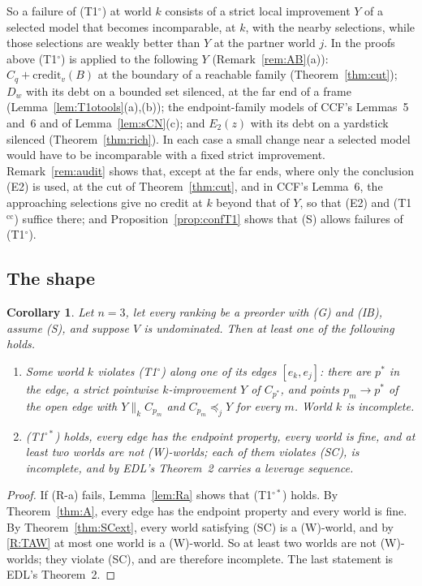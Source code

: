 \documentclass[11pt]{article}
\newtheorem{corollary}[theorem]{Corollary}
\theoremstyle{definition}\newtheorem{definition}[theorem]{Definition}
\theoremstyle{remark}\newtheorem{remark}[theorem]{Remark}
\newcommand{\cred}{\mathrm{credit}}
\newcommand{\To}{\textup{(T1$^\circ$)}}
\newcommand{\Tos}{\textup{(T1$^{\circ*}$)}}
\newcommand{\Tcc}{\textup{(T1$^{\mathrm{cc}}$)}}
\begin{document}
So a failure of \To{} at world $k$ consists of a strict local improvement
$Y$ of a selected model that becomes incomparable, at $k$, with the nearby
selections, while those selections are weakly better than $Y$ at the
partner world $j$. In the proofs above \To{} is applied to the following
$Y$ (Remark~\ref{rem:AB}(a)): $C_q+\cred_v(B)$ at the boundary of a
reachable family (Theorem~\ref{thm:cut}); $D_w$ with its debt on a bounded
set silenced, at the far end of a frame (Lemma~\ref{lem:T1otools}(a),(b));
the endpoint-family models of CCF's Lemmas~5 and~6 and of
Lemma~\ref{lem:sCN}(c); and $E_2(z)$ with its debt on a yardstick silenced
(Theorem~\ref{thm:rich}). In each case a small change near a selected model
would have to be incomparable with a fixed strict improvement.
Remark~\ref{rem:audit} shows that, except at the far ends, where only the
conclusion (E2) is used, at the cut of Theorem~\ref{thm:cut}, and in CCF's
Lemma~6, the approaching selections give no credit at $k$ beyond that of
$Y$, so that (E2) and \Tcc{} suffice there; and
Proposition~\ref{prop:confT1} shows that (S) allows failures of \To.

\subsection{The shape}\label{sec:C}

\begin{corollary}\label{cor:C}
Let $n=3$, let every ranking be a preorder with (G) and (IB), assume (S),
and suppose $V$ is undominated. Then at least one of the following holds.
\begin{enumerate}[label=(R-\alph*),leftmargin=*,itemsep=2pt]
\item Some world $k$ violates \To{} along one of its edges $[e_k,e_j]$:
there are $p^*$ in the edge, a strict pointwise $k$-improvement $Y$ of
$C_{p^*}$, and points $p_m\to p^*$ of the open edge with
$Y\parallel_kC_{p_m}$ and $C_{p_m}\preceq_jY$ for every $m$. World $k$ is
incomplete.
\item \Tos{} holds, every edge has the endpoint property, every world is
fine, and at least two worlds are not (W)-worlds; each of them violates
(SC), is incomplete, and by EDL's Theorem~2 carries a leverage sequence.
\end{enumerate}
\end{corollary}
\begin{proof}
If (R-a) fails, Lemma~\ref{lem:Ra} shows that \Tos{} holds. By
Theorem~\ref{thm:A}, every edge has the endpoint property and every world is
fine. By Theorem~\ref{thm:SCext}, every world satisfying (SC) is a
(W)-world, and by \ref{R:TAW} at most one world is a (W)-world. So at least
two worlds are not (W)-worlds; they violate (SC), and are therefore
incomplete. The last statement is EDL's Theorem~2.
\end{proof}
\end{document}
